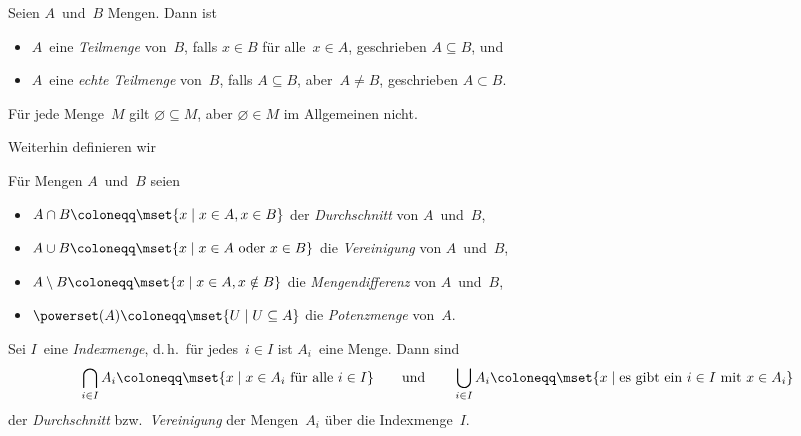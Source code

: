 \documentclass[a4paper]{article}
\begin{document}
\begin{definition}[Teilmenge]
    Seien $A$~und~$B$ Mengen. Dann ist
    \begin{itemize}
        \item $A$~eine \emph{Teilmenge} von~$B$, falls $x \in B$ für alle~$x \in A$, geschrieben $A \subseteq B$, und
        \item $A$~eine \emph{echte Teilmenge} von~$B$, falls $A \subseteq B$, aber~$A \neq B$, geschrieben $A \subset B$.
    \end{itemize}
\end{definition}

\begin{remark}
    Für jede Menge~$M$ gilt $\varnothing \subseteq M$, aber $\varnothing \in M$ im Allgemeinen nicht.
\end{remark}

Weiterhin definieren wir

\begin{definition}[Mengenoperatoren]
    Für Mengen $A$~und~$B$ seien
    \begin{itemize}
        \item $A \cap B \coloneqq \mset{x \mid x \in A, x \in B}$ der \emph{Durchschnitt} von $A$~und~$B$,
        \item $A \cup B \coloneqq \mset{x \mid x \in A \text{ oder } x \in B}$ die \emph{Vereinigung} von $A$~und~$B$,
        \item $A \setminus B \coloneqq \mset{x \mid x \in A, x \notin B}$ die \emph{Mengendifferenz} von $A$~und~$B$,
        \item $\powerset(A) \coloneqq \mset{U \mid U \subseteq A}$ die \emph{Potenzmenge} von~$A$.
    \end{itemize}
\end{definition}

\begin{definition}[Indexmenge]
    Sei $I$~eine \emph{Indexmenge}, d.\,h.\ für jedes~$i \in I$ ist $A_i$~eine Menge. Dann sind
    \begin{equation*}
        \bigcap_{i \in I} A_i \coloneqq \mset{x \mid x \in A_i \text{ für alle } i \in I} \qquad\text{und}\qquad \bigcup_{i \in I} A_i \coloneqq \mset{x \mid \text{es gibt ein } i \in I \text{ mit } x \in A_i}
    \end{equation*}
    der \emph{Durchschnitt} bzw.\ \emph{Vereinigung} der Mengen~$A_i$ über die Indexmenge~$I$.
\end{definition}
\end{document}
